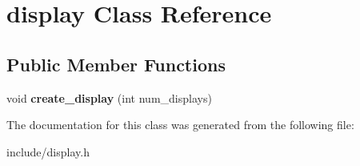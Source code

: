 \hypertarget{classdisplay}{}\section{display Class Reference}
\label{classdisplay}
\subsection*{Public Member Functions}
\begin{DoxyCompactItemize}
\item 
\mbox{\label{classdisplay_a4148a7a57f6a6e56008156817d9984b1}} 
void {\bfseries create\+\_\+display} (int num\+\_\+displays)
\end{DoxyCompactItemize}


The documentation for this class was generated from the following file\+:\begin{DoxyCompactItemize}
\item 
include/display.\+h\end{DoxyCompactItemize}
